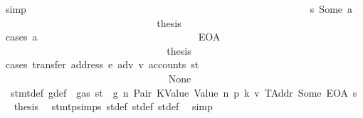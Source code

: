\begin{isabellebody}
\ simp\isanewline
\ \ \ \ \ \ \ \ \ \ \ \ \ \ \ \ \ \ \ \ \ \ \ \ \ \ \isamarkupfalse%
\isanewline
\ \ \ \ \ \ \ \ \ \ \ \ \ \ \ \ \ \ \ \ \ \ \ \ \ \ \ \ \isamarkupfalse%
\ s{}{\isacharcolon}{\kern0pt}\ {\isacharparenleft}{\kern0pt}Some\ a{\isacharparenright}{\kern0pt}\isanewline
\ \ \ \ \ \ \ \ \ \ \ \ \ \ \ \ \ \ \ \ \ \ \ \ \ \ \ \ \isamarkupfalse%
\ \isamarkupfalse%
\ {\isacharquery}{\kern0pt}thesis\isanewline
\ \ \ \ \ \ \ \ \ \ \ \ \ \ \ \ \ \ \ \ \ \ \ \ \ \ \ \ \isamarkupfalse%
\ {\isacharparenleft}{\kern0pt}cases\ a{\isacharparenright}{\kern0pt}\isanewline
\ \ \ \ \ \ \ \ \ \ \ \ \ \ \ \ \ \ \ \ \ \ \ \ \ \ \ \ \ \ \isamarkupfalse%
\ EOA\isanewline
\ \ \ \ \ \ \ \ \ \ \ \ \ \ \ \ \ \ \ \ \ \ \ \ \ \ \ \ \ \ \isamarkupfalse%
\ \isamarkupfalse%
\ {\isacharquery}{\kern0pt}thesis\isanewline
\ \ \ \ \ \ \ \ \ \ \ \ \ \ \ \ \ \ \ \ \ \ \ \ \ \ \ \ \ \ \isamarkupfalse%
\ {\isacharparenleft}{\kern0pt}cases\ {\isachardoublequoteopen}transfer\ {\isacharparenleft}{\kern0pt}address\ e{\isacharparenright}{\kern0pt}\ adv\ v{\isacharprime}{\kern0pt}\ {\isacharparenleft}{\kern0pt}accounts\ st{\isacharprime}{\kern0pt}{\isacharprime}{\kern0pt}{\isacharprime}{\kern0pt}{\isacharparenright}{\kern0pt}{\isachardoublequoteclose}{\isacharparenright}{\kern0pt}\isanewline
\ \ \ \ \ \ \ \ \ \ \ \ \ \ \ \ \ \ \ \ \ \ \ \ \ \ \ \ \ \ \ \ \isamarkupfalse%
\ None\isanewline
\ \ \ \ \ \ \ \ \ \ \ \ \ \ \ \ \ \ \ \ \ \ \ \ \ \ \ \ \ \ \ \ \isamarkupfalse%
\ {}{\isacharparenleft}{\kern0pt}{}{\isacharparenright}{\kern0pt}\ stmt{\isacharunderscore}{\kern0pt}def\ g{\isacharunderscore}{\kern0pt}def\ {\isacharbackquoteopen}{\isasymnot}\ gas\ st\ {\isasymle}\ g{\isacharbackquoteclose}\ n\ Pair\ KValue\ Value\ n{}\ p{}\ k{}\ v{}\ TAddr\ Some\ EOA\ s{}\ \isamarkupfalse%
\ {\isacharquery}{\kern0pt}thesis\ \isamarkupfalse%
\ stmt{\isachardot}{\kern0pt}psimps{\isacharparenleft}{\kern0pt}{}{\isacharparenright}{\kern0pt}\ st{\isacharprime}{\kern0pt}{\isacharunderscore}{\kern0pt}def\ st{\isacharprime}{\kern0pt}{\isacharprime}{\kern0pt}{\isacharunderscore}{\kern0pt}def\ st{\isacharprime}{\kern0pt}{\isacharprime}{\kern0pt}{\isacharprime}{\kern0pt}{\isacharunderscore}{\kern0pt}def\ \isamarkupfalse%
\ simp\isanewline
\ \ \ \ \ \ \ \ \ \ \ \ \ \ \ \ \ \ \ \ \ \ \ \ \ \ \ \ \ \ \isamarkupfalse%

\end{isabellebody}
